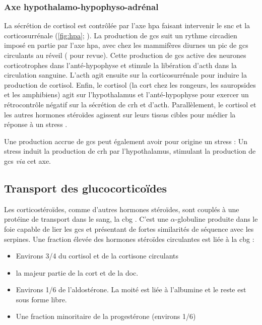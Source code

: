 \documentclass[../main.tex]{subfiles}
\begin{document}
			

		\subsubsection[Axe hypothalamo-hypophyso-adrénal]{Axe hypothalamo-hypophyso-adrénal}
			La sécrétion de cortisol est contrôlée par l'axe \gls{hpa} faisant intervenir le \gls{snc} et la corticosurrénale (\autoref{fig:hpa}; \citealp{Herman1997}).
			La production de \glspl{gc} suit un rythme circadien imposé en partie par l'axe \gls{hpa}, avec chez les mammifères diurnes un pic de \glspl{gc} circulants au réveil (\citealp{Dickmeis2009} pour revue).
			Cette production de \glspl{gc} active des neurones corticotrophes dans l'anté-hypophyse et stimule la libération d'\gls{acth} dans la circulation sanguine.
			L'\gls{acth} agit ensuite sur la corticosurrénale pour induire la production de cortisol.
			Enfin, le cortisol (la \gls{cort} chez les rongeurs, les sauropsides et les amphibiens) agit sur l'hypothalamus et l'anté-hypophyse pour exercer un rétrocontrôle négatif sur la sécrétion de \gls{crh} et d'\gls{acth}.
			Parallèlement, le cortisol et les autres hormones stéroïdes agissent sur leurs tissus cibles pour médier la réponse à un stress \citep{Herman1997,Tsigos2002}.
			\par
			Une production accrue de \glspl{gc} peut également avoir pour origine un stress :
			Un stress induit la production de \gls{crh} par l'hypothalamus, stimulant la production de \glspl{gc} \textit{via} cet axe.

			


	\subsection{Transport des glucocorticoïdes}
		Les corticostéroïdes, comme d'autres hormones stéroïdes, sont couplés à une protéine de transport dans le sang, la \gls{cbg} \citep{Rosner1990}.
		C'est une $\alpha$-globuline produite dans le foie capable de lier les \glspl{gc} et présentant de fortes similarités de séquence avec les serpines.
		Une fraction élevée des hormones stéroïdes circulantes est liée à la \gls{cbg} \citep{Bittar1997,Becker2001}:
		\begin{itemize}
		\item Environs 3/4 du cortisol et de la cortisone circulants
		\item la majeur partie de la \gls{cort} et de la \gls{doc}.
		\item Environs 1/6 de l'aldostérone. La moité est liée à l'albumine et le reste est sous forme libre.
		\item Une fraction minoritaire de la progestérone (environs 1/6)
		\end{itemize}
\end{document}

